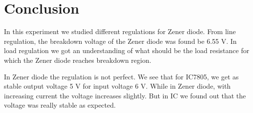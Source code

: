 \documentclass[12pt]{article}
\begin{document}
\section{Conclusion}
In this experiment we studied different regulations for Zener diode. From line regulation, the breakdown voltage of the Zener diode was found be 6.55 V. In load regulation we got an understanding of what should be the load resistance for which the Zener diode reaches breakdown region.

In Zener diode the regulation is not perfect. We see that for IC7805, we get as stable output voltage 5 V for input voltage 6 V. While in Zener diode, with increasing current the voltage increases slightly. But in IC we found out that the voltage was really stable as expected.
\end{document}
